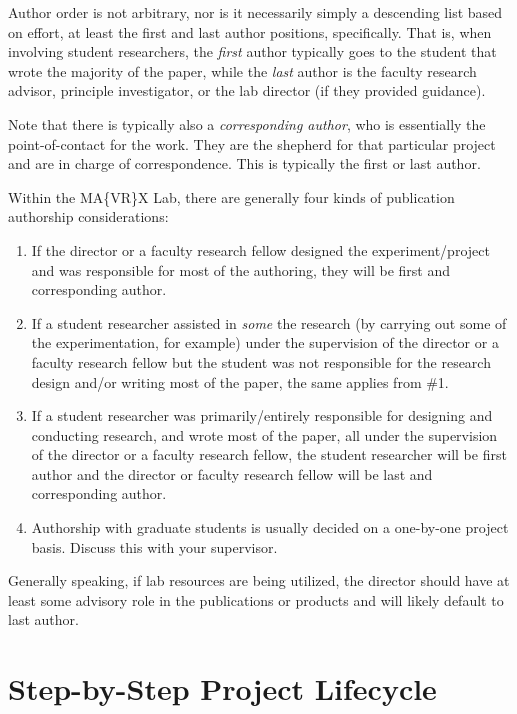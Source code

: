 \documentclass[]{tufte-book}
\providecommand{\tightlist}{%
  \setlength{\itemsep}{0pt}\setlength{\parskip}{0pt}}
\begin{document}
Author order is not arbitrary, nor is it necessarily simply a descending list based on effort, at least the first and last author positions, specifically. That is, when involving student researchers, the \emph{first} author typically goes to the student that wrote the majority of the paper, while the \emph{last} author is the faculty research advisor, principle investigator, or the lab director (if they provided guidance).

Note that there is typically also a \emph{corresponding author}, who is essentially the point-of-contact for the work. They are the shepherd for that particular project and are in charge of correspondence. This is typically the first or last author.

Within the MA\{VR\}X Lab, there are generally four kinds of publication authorship considerations:

\begin{enumerate}
\def\labelenumi{\arabic{enumi}.}
\tightlist
\item
  If the director or a faculty research fellow designed the experiment/project and was responsible for most of the authoring, they will be first and corresponding author.
\item
  If a student researcher assisted in \emph{some} the research (by carrying out some of the experimentation, for example) under the supervision of the director or a faculty research fellow but the student was not responsible for the research design and/or writing most of the paper, the same applies from \#1.
\item
  If a student researcher was primarily/entirely responsible for designing and conducting research, and wrote most of the paper, all under the supervision of the director or a faculty research fellow, the student researcher will be first author and the director or faculty research fellow will be last and corresponding author.
\item
  Authorship with graduate students is usually decided on a one-by-one project basis. Discuss this with your supervisor.
\end{enumerate}

Generally speaking, if lab resources are being utilized, the director should have at least some advisory role in the publications or products and will likely default to last author.

\hypertarget{appendix-appendix}{%
\appendix}


\hypertarget{step-by-step-project-lifecycle}{%
\chapter{Step-by-Step Project Lifecycle}\label{step-by-step-project-lifecycle}}
\end{document}
